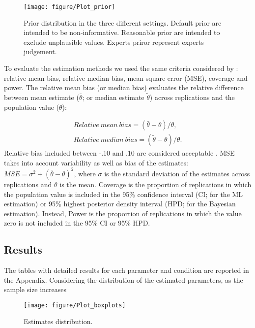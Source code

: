 \documentclass[graybox]{svmult}
\begin{document}
\begin{figure}[b]
	\sidecaption
	\label{fig:prior}
	\texttt{[image: figure/Plot\_prior]}
	\caption{Prior distribution in the three different settings. Default prior are intended to be non-informative. Reasonable prior  are intended to exclude unplausible values. Experts priror represent experts judgement.}
\end{figure}

To evaluate the estimation methods we used the same criteria considered by \cite{smidSemSmallSamples2020}: relative mean bias, relative median bias, mean square error (MSE), coverage and power. The relative mean bias (or median bias) evaluates the relative difference between mean estimate ($\bar{\theta}$; or median estimate $\widetilde{\theta}$) across replications and the population value ($\theta$):

\begin{eqnarray}
Relative\ mean\ bias = (\bar{\theta}-\theta)/\theta,\\
Relative\ median\ bias = (\widetilde{\theta}-\theta)/\theta.
\end{eqnarray}
Relative bias included between -.10 and .10 are considered acceptable \cite{smidSemSmallSamples2020}. MSE takes into account variability as well as bias of the estimates: $MSE = \sigma^2 + (\bar{\theta}- \theta)^2$, where $\sigma$ is the standard deviation of the estimates across replications and $\bar{\theta}$ is the mean. Coverage is the proportion of replications in which the population value is included in the 95\% confidence interval (CI; for the ML estimation) or 95\% highest posterior density interval (HPD; for the Bayesian estimation). Instead, Power is the proportion of replications in which the value zero is not included in the 95\% CI or 95\% HPD.

\subsection{Results}

The tables with detailed results for each parameter and condition are reported in the Appendix. Considering the distribution of the estimated parameters, as the sample size increases 

\begin{figure}[b]
	\sidecaption
	\label{fig:boxplots}
	\texttt{[image: figure/Plot\_boxplots]}
	\caption{Estimates distribution.}
\end{figure}
\end{document}
